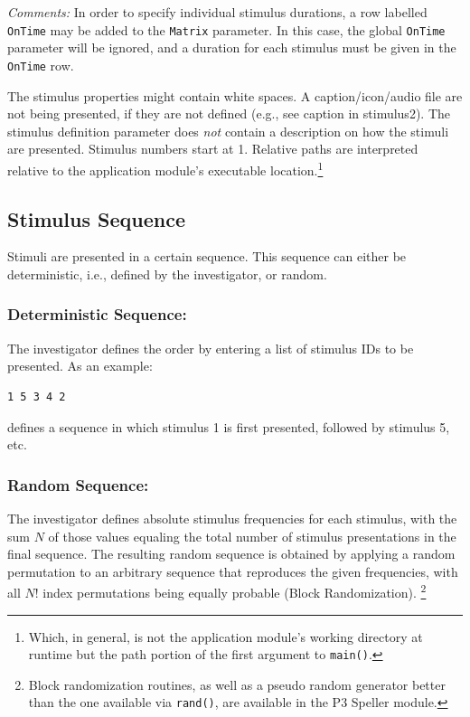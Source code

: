 \documentclass[letterpaper,oneside,12pt]{article}
\begin{document}
\emph{Comments:} In order to specify individual stimulus durations, a row labelled 
{\tt OnTime} may be added to the {\tt Matrix} parameter. In this case, the global 
{\tt OnTime} parameter will be ignored, and a duration for each stimulus must be
given in the {\tt OnTime} row.

The stimulus properties might contain white spaces. A 
caption/icon/audio file are not being presented, if they are not defined (e.g., 
see caption in stimulus2). The stimulus definition parameter does \emph{not} contain 
a description on how the stimuli are presented. Stimulus numbers start at 1.
Relative paths are interpreted relative to the application module's executable
location.\footnote{Which, in general, is not the application module's
working directory at runtime but the path portion of the first argument to \texttt{main()}.}

\subsection{Stimulus Sequence}

Stimuli are presented in a certain sequence. This sequence can either be 
deterministic, i.e., defined by the investigator, or random. 

\subsubsection{Deterministic Sequence:}The investigator defines the order by 
entering a list of stimulus IDs to be presented. As an example: 
\begin{verbatim} 
1 5 3 4 2 
\end{verbatim} 
defines a sequence in which stimulus 1 is first presented, followed by 
stimulus 5, etc.

\subsubsection{Random Sequence:}The investigator defines absolute stimulus 
frequencies for each stimulus, with the sum $N$ of those values equaling the total
number of stimulus presentations in the final sequence. The resulting random
sequence is obtained by applying a random permutation to an arbitrary sequence
that reproduces the given frequencies, with all $N!$ index permutations being
equally probable (Block Randomization).
\footnote{Block randomization routines, as well as a pseudo random generator better
than the one available via \texttt{rand()}, are available in the P3 Speller module.}
\end{document}
